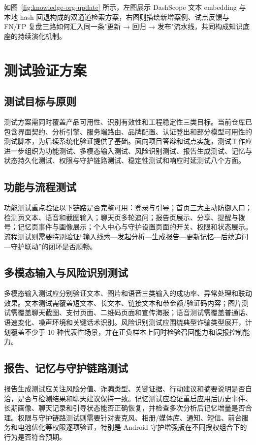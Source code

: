 \documentclass[UTF8,a4paper,12pt]{ctexart}
\begin{document}
如图~\ref{fig:knowledge-org-update} 所示，左图展示 DashScope 文本 embedding 与本地 hash 回退构成的双通道检索方案，右图则描绘新增案例、试点反馈与 FN/FP 复盘三路如何汇入同一条"更新 → 回归 → 发布"流水线，共同构成知识底座的持续演化机制。

\section{测试验证方案}

\subsection{测试目标与原则}

测试方案需同时覆盖产品可用性、识别有效性和工程稳定性三类目标。当前仓库已包含界面契约、分析引擎、服务端路由、品牌配置、认证登出和部分模型可用性的测试脚本，为后续系统化验证提供了基础。面向项目答辩和试点实施，测试工作应进一步组织为功能测试、多模态输入测试、风险识别测试、报告生成测试、记忆与状态持久化测试、权限与守护链路测试、稳定性测试和响应时延测试八个方面。

\subsection{功能与流程测试}

功能测试重点验证以下链路是否完整可用：登录与引导；首页三大主动防御入口；检测页文本、语音和截图输入；聊天页多轮追问；报告页展示、分享、提醒与拨号；记忆页事件与画像展示；个人中心与守护设置页面的开关、权限和状态展示。流程测试则需要特别验证“输入线索—发起分析—生成报告—更新记忆—后续追问—守护联动”的闭环是否顺畅。

\subsection{多模态输入与风险识别测试}

多模态输入测试应分别验证文本、图片和语音三类输入的成功率、异常处理和联动效果。文本测试需覆盖短文本、长文本、链接文本和带金额/验证码内容；图片测试需覆盖聊天截图、支付页面、二维码页面和宣传海报；语音测试需覆盖普通话、语速变化、噪声环境和关键话术识别。风险识别测试应围绕典型诈骗类型展开，计划覆盖不少于 10 种代表性场景，并在正负样本上同时检验召回能力和误报控制能力。

\subsection{报告、记忆与守护链路测试}

报告生成测试应关注风险分值、诈骗类型、关键证据、行动建议和摘要说明是否自洽，是否与检测结果和聊天建议保持一致。记忆测试应验证重启应用后历史事件、长期画像、聊天记录和引导状态能否正确恢复，并检查多次分析后记忆增量是否合理。权限与守护链路测试则需要针对麦克风、相册/媒体库、通知、短信、前台服务和电池优化等权限逐项验证，特别是 Android 守护增强版在不同授权组合下的行为是否符合预期。
\end{document}
